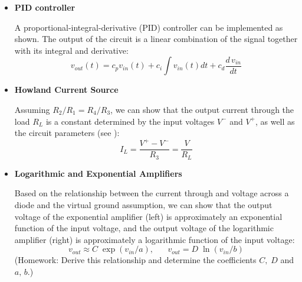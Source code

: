 \documentclass{article}
\begin{document}
\begin{itemize}
\item {\bf PID controller}

  A proportional-integral-derivative (PID) controller can be implemented
  as shown. The output of the circuit is a linear combination of the
  signal together with its integral and derivative:
  \begin{equation}
    v_{out}(t)=c_p v_{in}(t)+c_i \int v_{in}(t) dt +c_d\frac{d\,v_{in}}{dt}
  \end{equation}


\item {\bf Howland Current Source}


  Assuming $R_2/R_1=R_4/R_3$, we can show that the output current
  through the load $R_L$ is a constant determined by the input
  voltages $V^-$ and $V^+$, as well as the circuit parameters
  (see ):
  \begin{equation}
    I_L=\frac{V^+-V^-}{R_3}=\frac{V}{R_L}
  \end{equation}

  \begin{comment}
  \begin{equation}
    \frac{V^--V}{R_1}+\frac{V_0-V}{R_2}=0,\;\;\;\;\;\;
    \frac{V^+-V}{R_3}+\frac{V_0-V}{R_4}=\frac{V}{R_L};
  \end{equation}
  Solving the first equation for $V_0-V$:
  \begin{equation}
    V_0-V=(V-V^-)\frac{R_2}{R_1}=(V-V^-)\frac{R_4}{R_3}
  \end{equation}
  and substituting into the second equation, we get:
  \begin{equation}
    \frac{V^+-V}{R_3}+\frac{V-V^-}{R_3}
    =\frac{V^+-V^-}{R_3}=\frac{V}{R_L}=I_L
  \end{equation}
  We see that the current through the load resistor $R_L$
  is constant, independent of $R_L$, i.e., the circuit is
  a current source.
  \end{comment}

\item {\bf Logarithmic and Exponential Amplifiers}


  Based on the relationship between the current through and voltage 
  across a diode and the virtual ground assumption, we can show 
  that the output voltage of the exponential amplifier (left) is
  approximately an exponential function of the input voltage, and 
  the output voltage of the logarithmic amplifier (right) is 
  approximately a logarithmic function of the input voltage:
  \begin{equation}
    v_{out}\approx C \;\exp(v_{in}/a),\;\;\;\;\;\; v_{out}= D\; \ln (v_{in}/b)
  \end{equation}
  (Homework: Derive this relationship and determine the coefficients 
  $C,\;D$ and $a,\,b$.)


\end{itemize}
\end{document}
